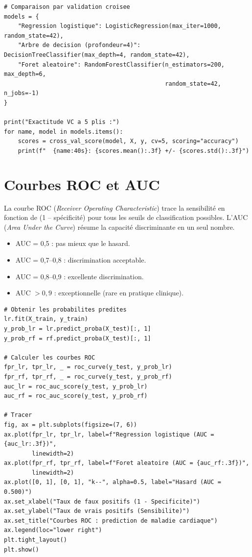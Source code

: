 \begin{verbatim}
# Comparaison par validation croisee
models = {
    "Regression logistique": LogisticRegression(max_iter=1000, random_state=42),
    "Arbre de decision (profondeur=4)": DecisionTreeClassifier(max_depth=4, random_state=42),
    "Foret aleatoire": RandomForestClassifier(n_estimators=200, max_depth=6,
                                              random_state=42, n_jobs=-1)
}

print("Exactitude VC a 5 plis :")
for name, model in models.items():
    scores = cross_val_score(model, X, y, cv=5, scoring="accuracy")
    print(f"  {name:40s}: {scores.mean():.3f} +/- {scores.std():.3f}")
\end{verbatim}

\section{Courbes ROC et AUC}

La courbe ROC (\emph{Receiver Operating Characteristic}) trace la sensibilit\'e en fonction de (1 -- sp\'ecificit\'e) pour tous les seuils de classification possibles. L'AUC (\emph{Area Under the Curve}) r\'esume la capacit\'e discriminante en un seul nombre.

\begin{itemize}
  \item AUC = 0,5 : pas mieux que le hasard.
  \item AUC = 0,7--0,8 : discrimination acceptable.
  \item AUC = 0,8--0,9 : excellente discrimination.
  \item AUC $> 0{,}9$ : exceptionnelle (rare en pratique clinique).
\end{itemize}

\begin{verbatim}
# Obtenir les probabilites predites
lr.fit(X_train, y_train)
y_prob_lr = lr.predict_proba(X_test)[:, 1]
y_prob_rf = rf.predict_proba(X_test)[:, 1]

# Calculer les courbes ROC
fpr_lr, tpr_lr, _ = roc_curve(y_test, y_prob_lr)
fpr_rf, tpr_rf, _ = roc_curve(y_test, y_prob_rf)
auc_lr = roc_auc_score(y_test, y_prob_lr)
auc_rf = roc_auc_score(y_test, y_prob_rf)

# Tracer
fig, ax = plt.subplots(figsize=(7, 6))
ax.plot(fpr_lr, tpr_lr, label=f"Regression logistique (AUC = {auc_lr:.3f})",
        linewidth=2)
ax.plot(fpr_rf, tpr_rf, label=f"Foret aleatoire (AUC = {auc_rf:.3f})",
        linewidth=2)
ax.plot([0, 1], [0, 1], "k--", alpha=0.5, label="Hasard (AUC = 0.500)")
ax.set_xlabel("Taux de faux positifs (1 - Specificite)")
ax.set_ylabel("Taux de vrais positifs (Sensibilite)")
ax.set_title("Courbes ROC : prediction de maladie cardiaque")
ax.legend(loc="lower right")
plt.tight_layout()
plt.show()
\end{verbatim}

